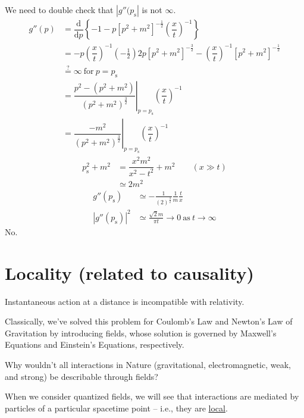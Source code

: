 \documentclass{article}
\begin{document}
\noindent We need to double check that $ | g'' (p_\mathrm{s} | $ is not $\infty$.
\begin{align*}
    g'' (p) &= \dfrac{\mathrm{d}}{\mathrm{d} p} \left\lbrace  -1 - p {[ p^2 + m^2 ]}^{-\frac{1}{2}} {\left( \dfrac{x}{t} \right)}^{-1} \right\rbrace \\
    &= - p {\left( \dfrac{x}{t} \right)}^{-1} \left( -\tfrac{1}{2} \right) 2p {[ p^2 + m^2 ]}^{-\frac{3}{2}} - {\left( \dfrac{x}{t} \right)}^{-1} {[ p^2 + m^2 ]}^{-\frac{1}{2}} \\
    &\stackrel{?}{=} \infty ~ \mathrm{for} ~ p = p_\mathrm{s} \\
    &= {\left. \dfrac{ p^2 - ( p^2 + m^2 ) }{ { ( p^2 + m^2 ) }^\frac{3}{2} } \right|}_{ p = p_\mathrm{s} } {\left( \dfrac{x}{t} \right)}^{-1} \\
    &= {\left. \dfrac{ - m^2 }{ { ( p^2 + m^2 ) }^\frac{3}{2} } \right|}_{ p = p_\mathrm{s} } {\left( \dfrac{x}{t} \right)}^{-1}
\end{align*}
\begin{align*}
    p_\mathrm{s}^2 + m^2 &= \dfrac{ x^2 m^2 }{ x^2 - t^2 } + m^2 \qquad ( x\gg t ) \\
    & \simeq 2 m^2
\end{align*}
\begin{align*}
    g'' (p_\mathrm{s}) &\simeq -\frac{1}{ {(2)}^\frac{3}{2} } \frac{1}{m} \frac{t}{x} \\
    {|g'' (p_\mathrm{s}) |}^2 &\simeq \frac{ \sqrt{2} m }{ \pi t } \longrightarrow 0 ~ \mathrm{as} ~ t \longrightarrow \infty
\end{align*}
No.

\section{Locality (related to causality)}

\noindent Instantaneous action at a distance is incompatible with relativity.

\noindent Classically, we've solved this problem for Coulomb's Law and Newton's Law of Gravitation by introducing fields, whose solution is governed by Maxwell's Equations and Einstein's Equations, respectively.


\noindent Why wouldn't all interactions in Nature (gravitational, electromagnetic, weak, and strong) be describable through fields?

\noindent When we consider quantized fields, we will see that interactions are mediated by particles of a particular spacetime point -- i.e., they are \underline{local}.
\end{document}

